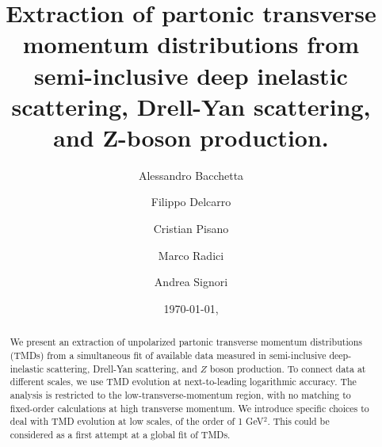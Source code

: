 \documentclass[aps,preprintnumbers,showpacs,nofootinbib,superscriptaddress,floatfix]{revtex4}
\newcommand{\AS}[1]{{\textcolor[rgb]{1,0,1}{#1}}}
\begin{document}
\allowdisplaybreaks[2]


\title{
Extraction of partonic transverse momentum distributions 
from semi-inclusive deep
inelastic scattering, Drell-Yan scattering, and Z-boson production.
}

\author{Alessandro Bacchetta}

\author{Filippo Delcarro}

\author{Cristian Pisano}

\author{Marco Radici}

\author{Andrea Signori}

\begin{abstract}
We present an extraction of unpolarized partonic transverse momentum
distributions (TMDs) 
from a simultaneous fit of available data measured in semi-inclusive \AS{deep-inelastic} scattering, 
Drell-Yan scattering, and $Z$ boson production. 
To connect data at different scales, we use TMD evolution at next-to-leading logarithmic accuracy. The
analysis is restricted to the low-transverse-momentum region, with no matching
to fixed-order calculations at high transverse momentum. We introduce specific
choices to deal with TMD evolution at low scales, of the order of 1 GeV$^2$.
This could be considered as a first attempt at a global fit of TMDs.
\end{abstract}


\date{\today, \currenttime}
\end{document}
